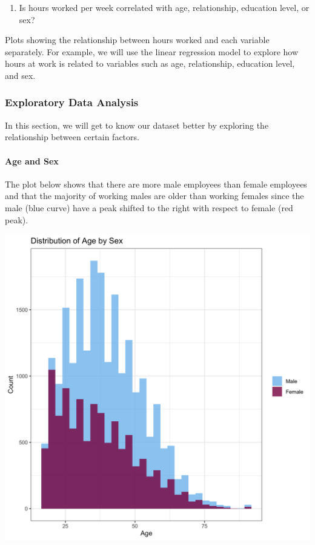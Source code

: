 \documentclass[]{article}
\providecommand{\tightlist}{%
  \setlength{\itemsep}{0pt}\setlength{\parskip}{0pt}}
\let\oldparagraph\paragraph
\renewcommand{\paragraph}[1]{\oldparagraph{#1}\mbox{}}
\begin{document}
\begin{enumerate}
\def\labelenumi{\arabic{enumi}.}
\setcounter{enumi}{1}
\tightlist
\item
  Is hours worked per week correlated with age, relationship, education
  level, or sex?
\end{enumerate}

Plots showing the relationship between hours worked and each variable
separately. For example, we will use the linear regression model to
explore how hours at work is related to variables such as age,
relationship, education level, and sex.

\hypertarget{exploratory-data-analysis}{%
\subsubsection{Exploratory Data
Analysis}\label{exploratory-data-analysis}}

In this section, we will get to know our dataset better by exploring the
relationship between certain factors.

\hypertarget{age-and-sex}{%
\paragraph{Age and Sex}\label{age-and-sex}}

The plot below shows that there are more male employees than female
employees and that the majority of working males are older than working
females since the male (blue curve) have a peak shifted to the right
with respect to female (red peak).

\includegraphics{../images/Plot_1_Distribution_of_Age_by_Sex.png}
\end{document}
